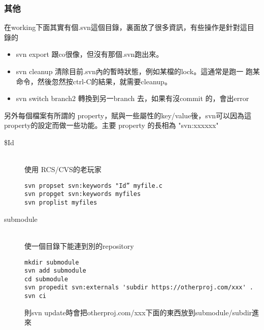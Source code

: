   \subsubsection{其他}
  在working下面其實有個.svn這個目錄，裏面放了很多資訊，有些操作是針對這目錄的
  \begin{itemize}
    \item svn export 跟co很像，但沒有那個.svn跑出來。
    \item svn cleanup 清除目前.svn內的暫時狀態，例如某檔的lock。這通常是跑一
      跑某命令，然後忽然按ctrl-C的結果，就需要cleanup。
    \item svn switch branch2 轉換到另一branch 去，如果有沒commit 的，會出error
  \end{itemize}
  另外每個檔案有所謂的 property，賦與一些屬性的key/value後，svn可以因為這
  property的設定而做一些功能。主要 property 的長相為 "svn:xxxxxx"
  \begin{description}
    \item [\$Id] \hfill \\
      使用 RCS/CVS的老玩家
      \begin{verbatim}
svn propset svn:keywords "Id” myfile.c
svn propget svn:keywords myfiles
svn proplist myfiles
      \end{verbatim}
    \item [submodule] \hfill \\
      使一個目錄下能連到別的repository
      \begin{verbatim}
mkdir submodule
svn add submodule
cd submodule
svn propedit svn:externals 'subdir https://otherproj.com/xxx' .
svn ci
      \end{verbatim}
      則svn update時會把otherproj.com/xxx下面的東西放到submodule/subdir進來
  \end{description}
